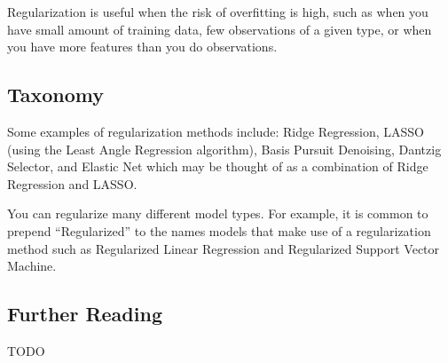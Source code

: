 \begin{bibunit}
Regularization is useful when the risk of overfitting is high, such as when you have small amount of training data, few observations of a given type, or when you have more features than you do observations.

\subsection{Taxonomy}
Some examples of regularization methods include:
Ridge Regression,
LASSO (using the Least Angle Regression algorithm),
Basis Pursuit Denoising, 
Dantzig Selector, 
and Elastic Net which may be thought of as a combination of Ridge Regression and LASSO.

You can regularize many different model types. For example, it is common to prepend ``Regularized'' to the names models that make use of a regularization method such as Regularized Linear Regression and Regularized Support Vector Machine.

\subsection{Further Reading}
TODO

\putbib
\end{bibunit}

\newpage\begin{bibunit}\putbib\end{bibunit}
\newpage\begin{bibunit}\putbib\end{bibunit}
\newpage\begin{bibunit}\putbib\end{bibunit}


